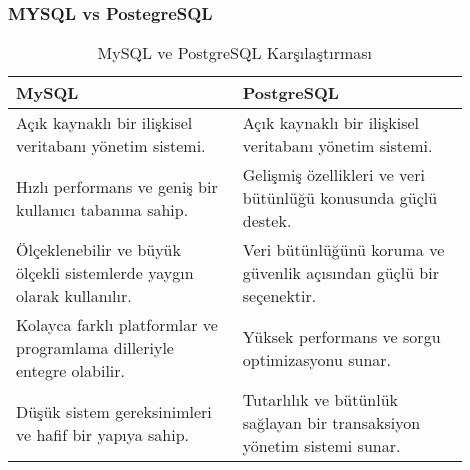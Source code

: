 \subsubsection{MYSQL vs PostegreSQL}
\begin{table}[!h]
    \centering
    \begin{tabular}{|p{0.45\linewidth}|p{0.45\linewidth}|}
      \hline
      \textbf{MySQL} & \textbf{PostgreSQL} \\ \hline
      Açık kaynaklı bir ilişkisel veritabanı yönetim sistemi. & Açık kaynaklı bir ilişkisel veritabanı yönetim sistemi. \\ \hline
      Hızlı performans ve geniş bir kullanıcı tabanına sahip. & Gelişmiş özellikleri ve veri bütünlüğü konusunda güçlü destek. \\ \hline
      Ölçeklenebilir ve büyük ölçekli sistemlerde yaygın olarak kullanılır. & Veri bütünlüğünü koruma ve güvenlik açısından güçlü bir seçenektir. \\ \hline
      Kolayca farklı platformlar ve programlama dilleriyle entegre olabilir. & Yüksek performans ve sorgu optimizasyonu sunar. \\ \hline
      Düşük sistem gereksinimleri ve hafif bir yapıya sahip. & Tutarlılık ve bütünlük sağlayan bir transaksiyon yönetim sistemi sunar. \\ \hline
      \end{tabular}
    \caption{MySQL ve PostgreSQL Karşılaştırması}
    \label{tab:mysql-postgresql}
\end{table}